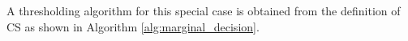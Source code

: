 A thresholding algorithm for this special case is obtained from the definition of CS as shown in Algorithm \ref{alg:marginal_decision}. 





